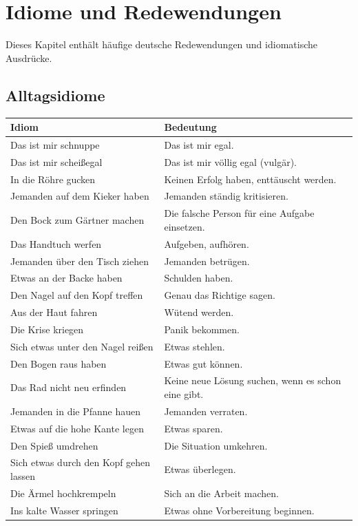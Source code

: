 \chapter{Idiome und Redewendungen}
\label{cha:Idiome}

Dieses Kapitel enthält häufige deutsche Redewendungen und idiomatische Ausdrücke.

\section{Alltagsidiome}
\label{sec:Alltagsidiome}

\bigskip
\begin{center}
\begin{tabular}{|l|p{8cm}|}
\hline
Idiom & Bedeutung \\ \hline
Das ist mir schnuppe & Das ist mir egal. \\ \hline
Das ist mir scheißegal & Das ist mir völlig egal (vulgär). \\ \hline
In die Röhre gucken & Keinen Erfolg haben, enttäuscht werden. \\ \hline
Jemanden auf dem Kieker haben & Jemanden ständig kritisieren. \\ \hline
Den Bock zum Gärtner machen & Die falsche Person für eine Aufgabe einsetzen. \\ \hline
Das Handtuch werfen & Aufgeben, aufhören. \\ \hline
Jemanden über den Tisch ziehen & Jemanden betrügen. \\ \hline
Etwas an der Backe haben & Schulden haben. \\ \hline
Den Nagel auf den Kopf treffen & Genau das Richtige sagen. \\ \hline
Aus der Haut fahren & Wütend werden. \\ \hline
Die Krise kriegen & Panik bekommen. \\ \hline
Sich etwas unter den Nagel reißen & Etwas stehlen. \\ \hline
Den Bogen raus haben & Etwas gut können. \\ \hline
Das Rad nicht neu erfinden & Keine neue Lösung suchen, wenn es schon eine gibt. \\ \hline
Jemanden in die Pfanne hauen & Jemanden verraten. \\ \hline
Etwas auf die hohe Kante legen & Etwas sparen. \\ \hline
Den Spieß umdrehen & Die Situation umkehren. \\ \hline
Sich etwas durch den Kopf gehen lassen & Etwas überlegen. \\ \hline
Die Ärmel hochkrempeln & Sich an die Arbeit machen. \\ \hline
Ins kalte Wasser springen & Etwas ohne Vorbereitung beginnen. \\ \hline
\end{tabular}
\end{center}

